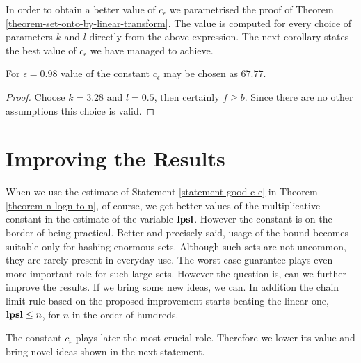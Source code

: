 In order to obtain a better value of $c_\epsilon$ we parametrised the proof of Theorem \ref{theorem-set-onto-by-linear-transform}. The value is computed for every choice of parameters $k$ and $l$ directly from the above expression. The next corollary states the best value of $c_\epsilon$ we have managed to achieve.

\begin{corollary}
For $\epsilon = 0.98$ value of the constant $c_\epsilon$ may be chosen as $67.77$.
\end{corollary}
\begin{proof}
Choose $k = 3.28$ and $l = 0.5$, then certainly $f \geq b$. Since there are no other assumptions this choice is valid.
\end{proof}

\section{Improving the Results}
When we use the estimate of Statement \ref{statement-good-c-e} in Theorem \ref{theorem-n-logn-to-n}, of course, we get better values of the multiplicative constant in the estimate of the variable $\mathbf{lpsl}$. However the constant is on the border of being practical. Better and precisely said, usage of the bound becomes suitable only for hashing enormous sets. Although such sets are not uncommon, they are rarely present in everyday use. The worst case guarantee plays even more important role for such large sets. However the question is, can we further improve the results. If we bring some new ideas, we can. In addition the chain limit rule based on the proposed improvement starts beating the linear one, $\mathbf{lpsl} \leq n$, for $n$ in the order of hundreds.

The constant $c_\epsilon$ plays later the most crucial role. Therefore we lower its value and bring novel ideas shown in the next statement.

